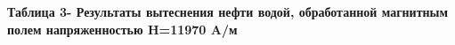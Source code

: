 
{\bfseries Таблица 3- Результаты вытеснения нефти водой, обработанной
магнитным полем напряженностью H=11970 A/м}

